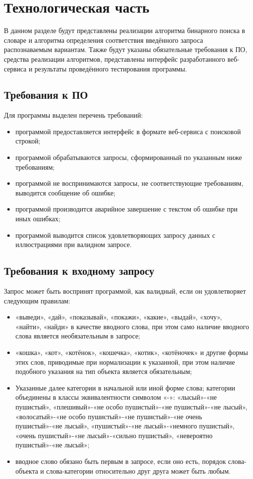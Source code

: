 \chapter{Технологическая часть}

В данном разделе будут представлены реализации алгоритма бинарного поиска в словаре и алгоритма определения соответствия введённого запроса распознаваемым вариантам. Также будут указаны обязательные требования к ПО, средства реализации алгоритмов, представлены интерфейс разработанного веб-сервиса и результаты проведённого тестирования программы.

\section{Требования к ПО}
Для программы выделен перечень требований:
\begin{itemize}
	\item программой предоставляется интерфейс в формате веб-сервиса с поисковой строкой;
	\item программой обрабатываются запросы, сформированный по указанным ниже требованиям;
	\item программой не воспринимаются запросы, не соответствующие требованиям, выводится сообщение об ошибке;
	\item программой производится аварийное завершение с текстом об ошибке при иных ошибках;
	\item программой выводится список удовлетворяющих запросу данных с иллюстрациями при валидном запросе.
\end{itemize}

\section{Требования к входному запросу}
Запрос может быть воспринят программой, как валидный, если он удовлетворяет следующим правилам:
\begin{itemize}
	\item «выведи», «дай», «показывай», «покажи», «какие», «выдай», «хочу», «найти», «найди» в качестве вводного слова, при этом само наличие вводного слова является необязательным в запросе;
	\item «кошка», «кот», «котёнок», «кошечка», «котик», «котёночек» и другие формы этих слов, приводимые при нормализации к указанной, при этом наличие подобного указания на тип объекта является обязательным;
	\item Указанные далее категории в начальной или иной форме слова; категории объединены в классы эквивалентности символом «-»: «лысый»-«не пушистый», «плешивый»-«не особо пушистый»-«не пушистый»-«не лысый», «волосатый»-«не особо пушистый»-«не пушистый»-«не очень пушистый»-«не лысый», «пушистый»-«не лысый»-«немного пушистый», «очень пушистый»-«не лысый»-«сильно пушистый», «невероятно пушистый»-«не лысый»;
	\item вводное слово обязано быть первым в запросе, если оно есть, порядок слова-объекта и слова-категории относительно друг друга может быть любым.
\end{itemize}

